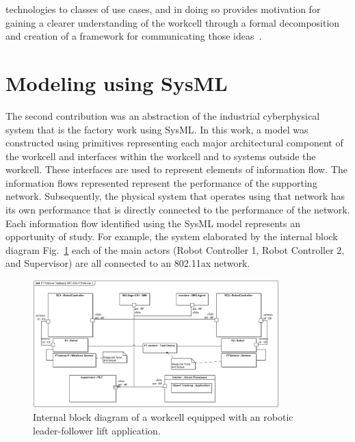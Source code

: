 technologies to classes of use cases, and in doing so provides motivation for gaining a clearer understanding of the workcell through a formal decomposition and creation of a framework for communicating those ideas~\cite{CandellISIT2020.Conf}.

\section{Modeling using SysML}
The second contribution was an abstraction of the industrial cyberphysical system that is the factory work using SysML.  In this work, a model was constructed using primitives representing each major architectural component of the workcell and interfaces within the workcell and to systems outside the workcell.  These interfaces are used to represent elements of information flow.  The information flows represented represent the performance of the supporting network.  Subsequently, the physical system that operates using that network has its own performance that is directly connected to the performance of the network.  Each information flow identified using the SysML model represents an opportunity of study.  For example, the system elaborated by the internal block diagram Fig.~\ref{fig:concl:lfscenario-full} each of the main actors (Robot Controller 1, Robot Controller 2, and Supervisor) are all connected to an 802.11ax network.

\begin{figure}[!th]
	\centering
	\includegraphics[width=0.85\textwidth]{chapter-conclusions/images/NIST-IWS-FTFollower}
	\caption{Internal block diagram of a workcell equipped with an robotic leader-follower lift application.}
	\label{fig:concl:lfscenario-full}
\end{figure}

